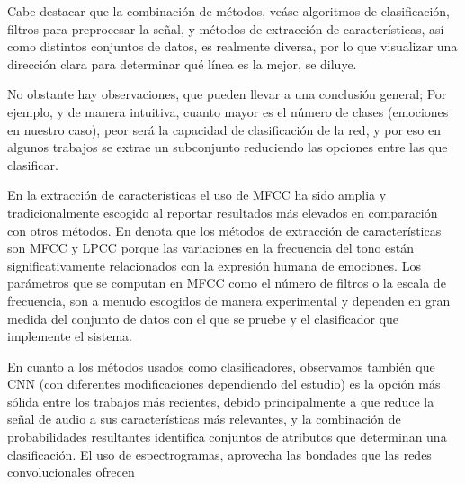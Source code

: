 \documentclass[11pt,a4paper,spanish]{book}
\begin{document}
	Cabe destacar que la combinación de métodos, veáse algoritmos de clasificación, filtros para preprocesar la señal, y métodos de extracción de características, así como distintos conjuntos de datos, es realmente diversa, por lo que visualizar una dirección clara para determinar qué línea es la mejor, se diluye. 
	
	No obstante hay observaciones, que pueden llevar a una conclusión general; Por ejemplo, y de manera intuitiva, cuanto mayor es el número de clases (emociones en nuestro caso), peor será la capacidad de clasificación de la red, y por eso en algunos trabajos se extrae un subconjunto reduciendo las opciones entre las que clasificar.  
	
	En la extracción de características el uso de MFCC ha sido amplia y tradicionalmente escogido al reportar resultados más elevados en comparación con otros métodos. En \cite{Langari2020} denota que los métodos de extracción de características son MFCC y LPCC porque las variaciones en la frecuencia del tono están significativamente relacionados con la expresión humana de emociones. Los parámetros que se computan en MFCC como el número de filtros o la escala de frecuencia, son a menudo escogidos de manera experimental y dependen en gran medida del conjunto de datos con el que se pruebe y el clasificador que implemente el sistema.
	
	En cuanto a los métodos usados como clasificadores, observamos también que CNN (con diferentes modificaciones dependiendo del estudio) es la opción más sólida entre los trabajos más recientes, debido principalmente a que reduce la señal de audio a sus características más relevantes, y la combinación de probabilidades resultantes identifica conjuntos de atributos que determinan una clasificación. El uso de espectrogramas, aprovecha las bondades que las redes convolucionales ofrecen
	

	
	\printbibliography
\end{document}
